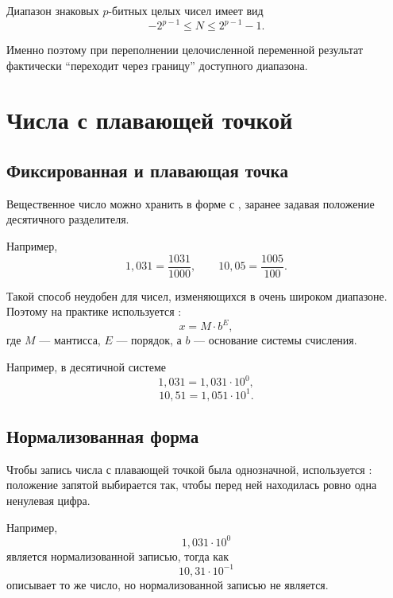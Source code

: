 \documentclass[../final.tex]{subfiles}
\begin{document}
Диапазон знаковых $p$-битных целых чисел имеет вид
%
\begin{equation*}
    -2^{p-1}
    \leq
    N
    \leq
    2^{p-1}-1.
\end{equation*}

\remark
Именно поэтому при переполнении целочисленной переменной
результат фактически ``переходит через границу'' доступного
диапазона.


\section{Числа с плавающей точкой}

\subsection{Фиксированная и плавающая точка}

Вещественное число можно хранить в форме с
, заранее задавая положение
десятичного разделителя.

Например,
%
\[
    1{,}031
    =
    \frac{1031}{1000},
    \qquad
    10{,}05
    =
    \frac{1005}{100}.
\]

Такой способ неудобен для чисел, изменяющихся в очень широком
диапазоне. Поэтому на практике используется
:
%
\begin{equation*}
    x
    =
    M\cdot b^E,
\end{equation*}
%
где $M$ --- мантисса, $E$ --- порядок, а $b$ --- основание
системы счисления.

Например, в десятичной системе
%
\[
    1{,}031
    =
    1{,}031\cdot10^0,
\]
%
\[
    10{,}51
    =
    1{,}051\cdot10^1.
\]


\subsection{Нормализованная форма}

Чтобы запись числа с плавающей точкой была однозначной,
используется : положение запятой
выбирается так, чтобы перед ней находилась ровно одна ненулевая
цифра.

Например,
%
\[
    1{,}031\cdot10^0
\]
%
является нормализованной записью, тогда как
%
\[
    10{,}31\cdot10^{-1}
\]
%
описывает то же число, но нормализованной записью не является.
\end{document}

